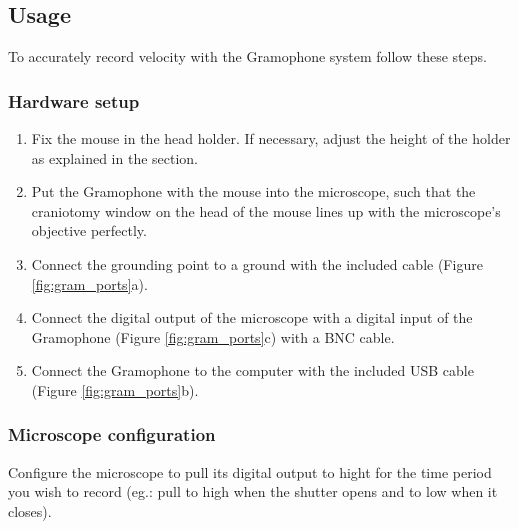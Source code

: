 \documentclass[11pt,a4paper]{article}
\begin{document}
\subsection{Usage}
To accurately record velocity with the Gramophone system follow these steps.

\subsubsection{Hardware setup}
\begin{enumerate}
\item Fix the mouse in the head holder. If necessary, adjust the height of the holder as explained in the   section.
\item Put the Gramophone with the mouse into the microscope, such that the craniotomy window on the head of the mouse lines up with the microscope's objective perfectly.
\item Connect the grounding point to a ground with the included cable (Figure \ref{fig:gram_ports}a).
\item Connect the digital output of the microscope with a digital input of the Gramophone (Figure \ref{fig:gram_ports}c) with a BNC cable.
\item Connect the Gramophone to the computer with the included USB cable (Figure \ref{fig:gram_ports}b).
\end{enumerate}

\subsubsection{Microscope configuration}
Configure the microscope to pull its digital output to hight for the time period you wish to record (eg.: pull to high when the shutter opens and to low when it closes).
\end{document}
